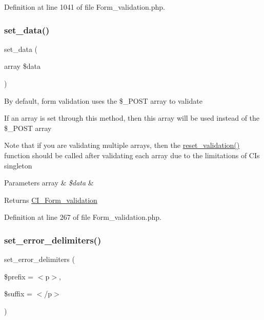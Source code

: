 Definition at line 1041 of file Form\+\_\+validation.\+php.

\mbox{\label{class_c_i___form__validation_af211c000380b8b345c6eb102cb5ca453}} 
\subsubsection{\texorpdfstring{set\_data()}{set\_data()}}
{\footnotesize\ttfamily set\+\_\+data (\begin{DoxyParamCaption}\item[{array}]{\$data }\end{DoxyParamCaption})}

By default, form validation uses the \$\+\_\+\+P\+O\+ST array to validate

If an array is set through this method, then this array will be used instead of the \$\+\_\+\+P\+O\+ST array

Note that if you are validating multiple arrays, then the \mbox{\hyperlink{class_c_i___form__validation_a84b8bd64032f6be532968015cba11361}{reset\+\_\+validation()}} function should be called after validating each array due to the limitations of CI\textquotesingle{}s singleton


\begin{DoxyParams}[1]{Parameters}
array & {\em \$data} & \\
\hline
\end{DoxyParams}
\begin{DoxyReturn}{Returns}
\mbox{\hyperlink{class_c_i___form__validation}{C\+I\+\_\+\+Form\+\_\+validation}} 
\end{DoxyReturn}


Definition at line 267 of file Form\+\_\+validation.\+php.

\mbox{\label{class_c_i___form__validation_ac45ddc321a1c1e5d5aad6e11f1f29b9c}} 
\subsubsection{\texorpdfstring{set\_error\_delimiters()}{set\_error\_delimiters()}}
{\footnotesize\ttfamily set\+\_\+error\+\_\+delimiters (\begin{DoxyParamCaption}\item[{}]{\$prefix = {\ttfamily \textquotesingle{}$<$p$>$\textquotesingle{}},  }\item[{}]{\$suffix = {\ttfamily \textquotesingle{}$<$/p$>$\textquotesingle{}} }\end{DoxyParamCaption})}

